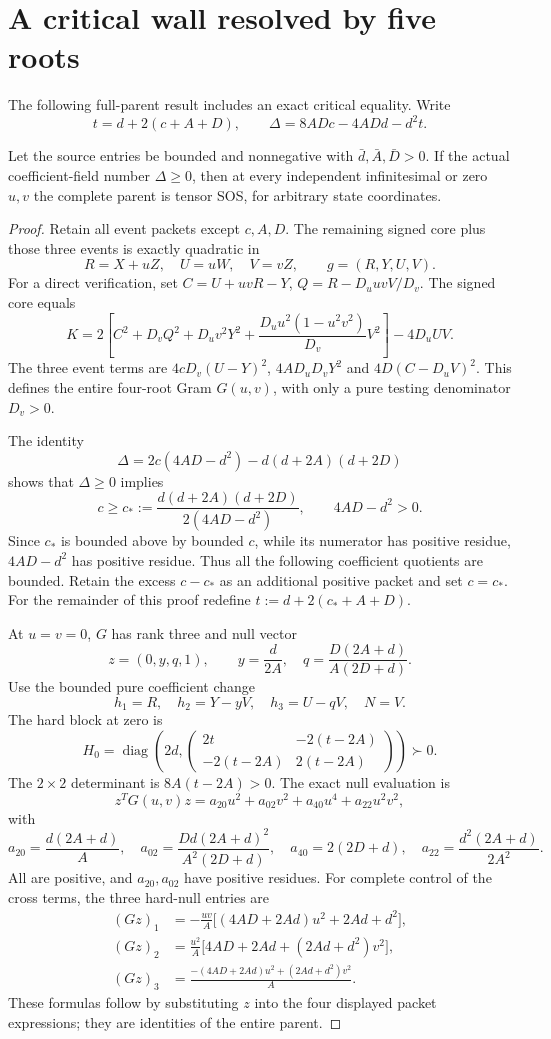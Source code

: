 \section{A critical wall resolved by five roots}\label{sec:wall}
The following full-parent result includes an exact critical equality. Write
\[
t=d+2(c+A+D),\qquad
\Delta=8ADc-4ADd-d^2t.
\]
\begin{theorem}\label{thm:wall}
Let the source entries be bounded and nonnegative with $\bar d,\bar A,\bar D>0$. If the actual coefficient-field number $\Delta\ge0$, then at every independent infinitesimal or zero $u,v$ the complete parent is tensor SOS, for arbitrary state coordinates.
\end{theorem}
\begin{proof}
Retain all event packets except $c,A,D$. The remaining signed core plus those three events is exactly quadratic in
\[
R=X+uZ,\quad U=uW,\quad V=vZ,\qquad g=(R,Y,U,V).
\]
For a direct verification, set $C=U+uvR-Y$, $Q=R-D_uuvV/D_v$. The signed core equals
\[
K=2\left[C^2+D_vQ^2+D_uv^2Y^2+
\frac{D_uu^2(1-u^2v^2)}{D_v}V^2\right]-4D_uUV.
\]
The three event terms are $4cD_v(U-Y)^2$, $4AD_uD_vY^2$ and $4D(C-D_uV)^2$. This defines the entire four-root Gram $G(u,v)$, with only a pure testing denominator $D_v>0$.

The identity
\[
\Delta=2c(4AD-d^2)-d(d+2A)(d+2D)
\]
shows that $\Delta\ge0$ implies
\[
c\ge c_*:=\frac{d(d+2A)(d+2D)}{2(4AD-d^2)},\qquad 4AD-d^2>0.
\]
Since $c_*$ is bounded above by bounded $c$, while its numerator has positive residue, $4AD-d^2$ has positive residue. Thus all the following coefficient quotients are bounded. Retain the excess $c-c_*$ as an additional positive packet and set $c=c_*$. For the remainder of this proof redefine $t:=d+2(c_*+A+D)$.

At $u=v=0$, $G$ has rank three and null vector
\[
z=(0,y,q,1),\qquad
y=\frac d{2A},\quad q=\frac{D(2A+d)}{A(2D+d)}.
\]
Use the bounded pure coefficient change
\[
h_1=R,\quad h_2=Y-yV,\quad h_3=U-qV,\quad N=V.
\]
The hard block at zero is
\[
H_0=\operatorname{diag}\!\left(2d,
\begin{pmatrix}2t&-2(t-2A)\\-2(t-2A)&2(t-2A)\end{pmatrix}\right)\succ0.
\]
The $2\times2$ determinant is $8A(t-2A)>0$. The exact null evaluation is
\[
z^TG(u,v)z=a_{20}u^2+a_{02}v^2+a_{40}u^4+a_{22}u^2v^2,
\]
with
\[
a_{20}=\frac{d(2A+d)}A,\quad
a_{02}=\frac{Dd(2A+d)^2}{A^2(2D+d)},\quad
a_{40}=2(2D+d),\quad
a_{22}=\frac{d^2(2A+d)}{2A^2}.
\]
All are positive, and $a_{20},a_{02}$ have positive residues. For complete control of the cross terms, the three hard-null entries are
\begin{align*}
(Gz)_1&=-\frac{uv}{A}\big[(4AD+2Ad)u^2+2Ad+d^2\big],\\
(Gz)_2&=\frac{u^2}{A}\big[4AD+2Ad+(2Ad+d^2)v^2\big],\\
(Gz)_3&=\frac{-(4AD+2Ad)u^2+(2Ad+d^2)v^2}{A}.
\end{align*}
These formulas follow by substituting $z$ into the four displayed packet expressions; they are identities of the entire parent.


\end{proof}
